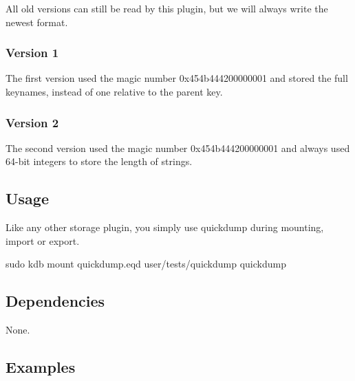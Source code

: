 All old versions can still be read by this plugin, but we will always write the newest format.

\subsubsection*{Version 1}

The first version used the magic number {\ttfamily 0x454b444200000001} and stored the full keynames, instead of one relative to the parent key.

\subsubsection*{Version 2}

The second version used the magic number {\ttfamily 0x454b444200000001} and always used 64-\/bit integers to store the length of strings.

\subsection*{Usage}

Like any other storage plugin, you simply use {\ttfamily quickdump} during mounting, import or export.


\begin{DoxyCode}
sudo kdb mount quickdump.eqd user/tests/quickdump quickdump
\end{DoxyCode}


\subsection*{Dependencies}

None.

\subsection*{Examples}


